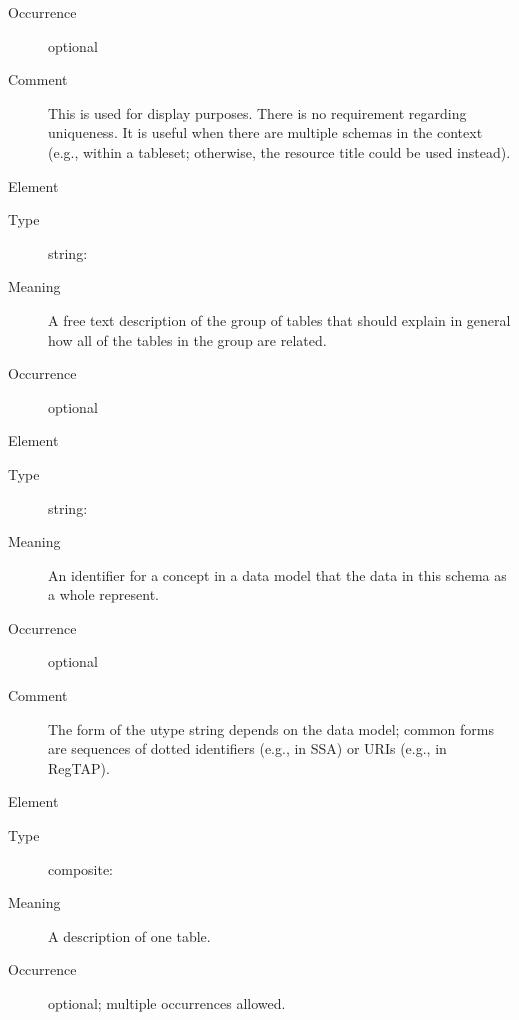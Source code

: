 \documentclass[11pt,a4paper]{ivoa}
\begin{document}
\begin{generated}
\begin{bigdescription}
\begin{description}
\item[Occurrence] optional
\item[Comment]
                  This is used for display purposes.  There is no requirement
                  regarding uniqueness.  It is useful when there are
                  multiple schemas in the context (e.g., within a
                  tableset; otherwise, the resource title could be
                  used instead).


\end{description}
\item[Element \xmlel{description}]
\begin{description}
\item[Type] string: 
\item[Meaning]
               A free text description of the group of tables that should
               explain in general how all of the tables in the group are
               related.

\item[Occurrence] optional

\end{description}
\item[Element \xmlel{utype}]
\begin{description}
\item[Type] string: 
\item[Meaning]
                  An identifier for a concept in a data model that
                  the data in this schema as a whole represent.

\item[Occurrence] optional
\item[Comment]
                  The form of the utype string depends on the data
                  model; common forms are sequences of dotted identifiers
                  (e.g., in SSA) or URIs (e.g., in RegTAP).


\end{description}
\item[Element \xmlel{table}]
\begin{description}
\item[Type] composite: 
\item[Meaning]
               A description of one table.

\item[Occurrence] optional; multiple occurrences allowed.

\end{description}


\end{bigdescription}\endgroup

\endgroup
\end{generated}
\end{document}
